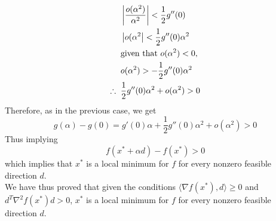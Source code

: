 \begin{align}
    &\left| \frac{o(\alpha^2)}{\alpha^2} \right| < \frac{1}{2}g''(0) \\
    &\left| o(\alpha^2 \right| < \frac{1}{2}g''(0) \alpha^2\\  
    &\text{given that } o(\alpha^2) < 0, \\
    &o(\alpha^2) > - \frac{1}{2}g''(0) \alpha^2\\
    \therefore \hspace{0.2cm} &\frac{1}{2}g''(0) \alpha^2 + o(\alpha^2) > 0
\end{align}
Therefore, as in the previous case, we get
\begin{equation}
    g(\alpha) - g(0) = g'(0)\alpha + \frac{1}{2} g''(0) \alpha^2 + o(\alpha^2) > 0
\end{equation}
Thus implying
\begin{equation}
    f(x^* + \alpha d) - f(x^*) > 0
\end{equation}
which implies that $x^*$ is a local minimum for $f$ for every nonzero feasible direction $d$.\\
We have thus proved that given the conditions $\langle\nabla f(x^*),d \rangle \geq 0$ and $d^T \nabla^2 f(x^*)d > 0$, $x^*$ is a local minimum for $f$ for every nonzero feasible direction $d$.
\QEDB


